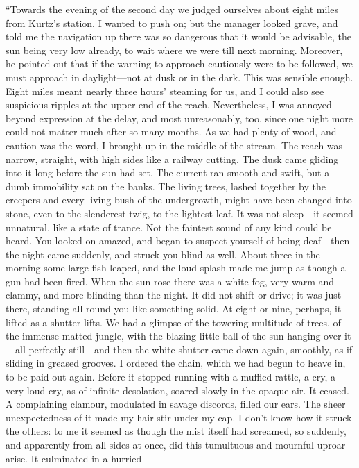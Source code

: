 \documentclass[12pt]{report}
\begin{document}
``Towards the evening of the second day we judged ourselves about eight
miles from Kurtz's station. I wanted to push on; but the manager looked
grave, and told me the navigation up there was so dangerous that it
would be advisable, the sun being very low already, to wait where we
were till next morning. Moreover, he pointed out that if the warning to
approach cautiously were to be followed, we must approach in
daylight---not at dusk or in the dark. This was sensible enough. Eight
miles meant nearly three hours' steaming for us, and I could also see
suspicious ripples at the upper end of the reach. Nevertheless, I was
annoyed beyond expression at the delay, and most unreasonably, too,
since one night more could not matter much after so many months. As we
had plenty of wood, and caution was the word, I brought up in the middle
of the stream. The reach was narrow, straight, with high sides like a
railway cutting. The dusk came gliding into it long before the sun had
set. The current ran smooth and swift, but a dumb immobility sat on the
banks. The living trees, lashed together by the creepers and every
living bush of the undergrowth, might have been changed into stone, even
to the slenderest twig, to the lightest leaf. It was not sleep---it
seemed unnatural, like a state of trance. Not the faintest sound of any
kind could be heard. You looked on amazed, and began to suspect yourself
of being deaf---then the night came suddenly, and struck you blind as
well. About three in the morning some large fish leaped, and the loud
splash made me jump as though a gun had been fired. When the sun rose
there was a white fog, very warm and clammy, and more blinding than the
night. It did not shift or drive; it was just there, standing all round
you like something solid. At eight or nine, perhaps, it lifted as a
shutter lifts. We had a glimpse of the towering multitude of trees, of
the immense matted jungle, with the blazing little ball of the sun
hanging over it---all perfectly still---and then the white shutter came
down again, smoothly, as if sliding in greased grooves. I ordered the
chain, which we had begun to heave in, to be paid out again. Before it
stopped running with a muffled rattle, a cry, a very loud cry, as of
infinite desolation, soared slowly in the opaque air. It ceased. A
complaining clamour, modulated in savage discords, filled our ears. The
sheer unexpectedness of it made my hair stir under my cap. I don't know
how it struck the others: to me it seemed as though the mist itself had
screamed, so suddenly, and apparently from all sides at once, did this
tumultuous and mournful uproar arise. It culminated in a hurried
\end{document}
